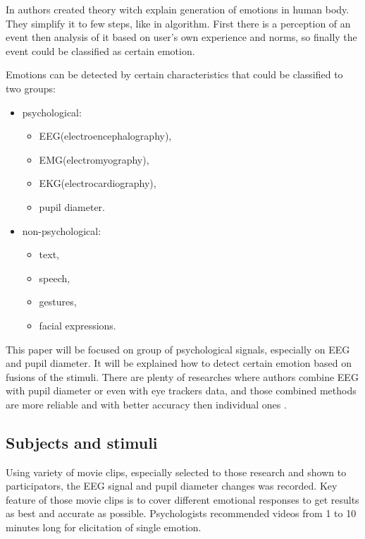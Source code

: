 \documentclass[10pt,journal,compsoc,twoside]{IEEEtran}
\begin{document}
In \cite{OrtonyCloreCollins1988} authors created theory witch explain generation of emotions in human body. They simplify it to few steps, like in algorithm. First there is a perception of an event then analysis of it based on user's own experience and norms, so finally the event could be classified as certain emotion.

Emotions can be detected by certain characteristics that could be classified to two groups:
\begin{itemize}
	\item psychological:
	\begin{itemize}
		\item EEG(electroencephalography),
		\item EMG(electromyography), 
		\item EKG(electrocardiography), 
		\item pupil diameter.
	\end{itemize} 
	\item non-psychological: 
	\begin{itemize} 
		\item text, 
		\item speech,
		\item  gestures, 
		\item facial expressions.
	\end{itemize}
\end{itemize}
This paper will be focused on group of psychological signals, especially on EEG and pupil diameter. It will be explained how to detect certain emotion based on fusions of the stimuli. There are plenty of researches where authors combine EEG with pupil diameter or even with eye trackers data, and those combined methods are more reliable and with better accuracy then individual ones \cite{WeiLongBoNanBaoLiang2014,CalvoDMello2010,SoleymaniPanticPun2002}. 

\subsection{Subjects and stimuli}
Using variety of movie clips, especially selected to those research and shown to participators, the EEG signal and pupil diameter changes was recorded. Key feature of those movie clips is to cover different emotional responses to get results as best and accurate as possible. Psychologists recommended videos from 1 to 10 minutes long for elicitation of single emotion\cite{SchaeferNilsSanchezPhilippot2010}.
\end{document}
